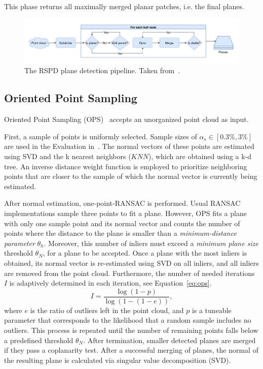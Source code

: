 \documentclass[main.tex]{subfiles}
\begin{document}
This phase returns all maximally merged planar patches, i.e. the final planes.

\begin{figure}[]
    \centering
    \includegraphics[width=\textwidth]{images/rspd.png}
    \caption[RSPD Pipeline]{The RSPD plane detection pipeline. Taken from~\cite[Figure~2]{Araújo_Oliveira_2020}.}
    \label{fig:rspd}
\end{figure}

\subsection{Oriented Point Sampling}
\label{subsec:bg-ops}
Oriented Point Sampling (OPS)~\cite{Sun_Mordohai_2019} accepts an unorganized point cloud as input.


First, a sample of points is uniformly selected. Sample sizes of $\alpha_s \in [0.3\%,3\%]$ are used in the Evaluation in~\cite[Table~3]{Sun_Mordohai_2019}.
The normal vectors of these points are estimated using SVD and the k nearest neighbors ($KNN$), which are obtained using a k-d tree. 
An inverse distance weight function is employed to prioritize neighboring points that are closer to the sample of which the normal vector is currently being estimated.


After normal estimation, one-point-RANSAC is performed. Usual RANSAC implementations sample three points to fit a plane. 
However, OPS fits a plane with only one sample point and its normal vector and counts the number of points where the distance to
the plane is smaller than a \textit{minimum-distance parameter} $\theta_h$. Moreover, this number of inliers must exceed a 
\textit{minimum plane size} threshold $\theta_N$, for a plane to be accepted.
Once a plane with the most inliers is obtained, its normal vector is re-estimated using SVD on all inliers, and all inliers are removed from the point cloud.
Furthermore, the number of needed iterations $I$ is adaptively determined in each iteration, see Equation~\ref{eq:ops}. 
\begin{equation}
    \label{eq:ops}
    I = \frac{\log(1-p)}{\log(1-(1-e))},
\end{equation}
where $e$ is the ratio of outliers left in the point cloud, and $p$ is a tuneable parameter that corresponds to the likelihood
that a random sample includes no outliers.
This process is repeated until the number of remaining points falls below a predefined threshold $\theta_N$.
After termination, smaller detected planes are merged if they pass a coplanarity test. After a successful merging of planes,
the normal of the resulting plane is calculated via singular value decomposition (SVD).
\end{document}

